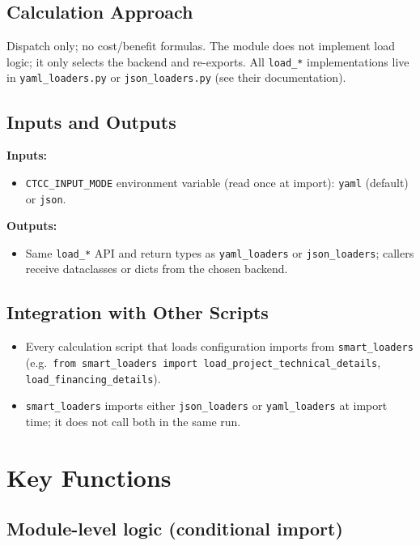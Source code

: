 \documentclass[ctcc_full_documentation.tex]{subfiles}
\begin{document}
\subsection{Calculation Approach}

Dispatch only; no cost/benefit formulas. The module does not implement load logic; it only selects the backend and re-exports. All \texttt{load\_*} implementations live in \texttt{yaml\_loaders.py} or \texttt{json\_loaders.py} (see their documentation).

\subsection{Inputs and Outputs}

\textbf{Inputs:}
\begin{itemize}
    \item \texttt{CTCC\_INPUT\_MODE} environment variable (read once at import): \texttt{yaml} (default) or \texttt{json}.
\end{itemize}

\textbf{Outputs:}
\begin{itemize}
    \item Same \texttt{load\_*} API and return types as \texttt{yaml\_loaders} or \texttt{json\_loaders}; callers receive dataclasses or dicts from the chosen backend.
\end{itemize}

\subsection{Integration with Other Scripts}

\begin{itemize}
    \item Every calculation script that loads configuration imports from \texttt{smart\_loaders} (e.g.\ \texttt{from smart\_loaders import load\_project\_technical\_details}, \texttt{load\_financing\_details}).
    \item \texttt{smart\_loaders} imports either \texttt{json\_loaders} or \texttt{yaml\_loaders} at import time; it does not call both in the same run.
\end{itemize}

\section{Key Functions}

\subsection{Module-level logic (conditional import)}
\end{document}
